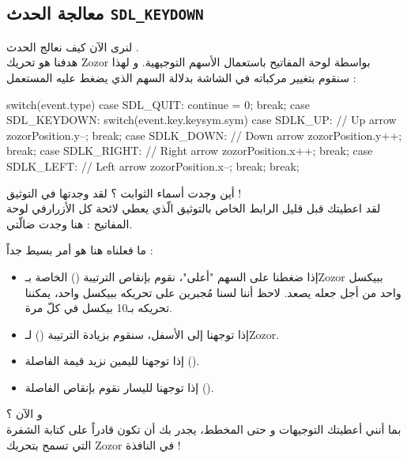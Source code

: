 \subsection{معالجة الحدث \texttt{SDL\_KEYDOWN}}

لنرى الآن كيف نعالج الحدث 
.\\
هدفنا هو تحريك 
\textenglish{Zozor}
بواسطة لوحة المفاتيح باستعمال الأسهم التوجيهية. و لهذا سنقوم بتغيير مركباته في الشاشة بدلالة السهم الذي يضغط عليه المستعمل :

\begin{Csource}
switch(event.type)
{
	case SDL_QUIT:
	continue = 0;
	break;
	case SDL_KEYDOWN:
	switch(event.key.keysym.sym)
	{
		case SDLK_UP: // Up arrow
		zozorPosition.y--;
		break;
		case SDLK_DOWN: // Down arrow
		zozorPosition.y++;
		break;
		case SDLK_RIGHT: // Right arrow
		zozorPosition.x++;
		break;
		case SDLK_LEFT: // Left arrow
		zozorPosition.x--;
		break;
	}
	break;
}
\end{Csource}

أين وجدت أسماء الثوابت ؟  لقد وجدتها في التوثيق !\\
لقد اعطيتك قبل قليل الرابط الخاص بالتوثيق الّذي يعطي لائحة كل الأزرارفي لوحة المفاتيح : هنا وجدت ضالّتي. 

ما فعلناه هنا هو أمر بسيط جداً :

\begin{itemize}
	\item إذا ضغطنا على السهم "أعلى"، نقوم بإنقاص الترتيبة 
	()
	الخاصة بـ\textenglish{Zozor}
	ببيكسل واحد من أجل جعله يصعد. لاحظ أننا لسنا مُجبرين على تحريكه ببيكسل واحد، يمكننا تحريكه بـ10 بيكسل في كلّ مرة.
	\item إذا توجهنا إلى الأسفل، سنقوم بزيادة الترتيبة
	()
	لـ\textenglish{Zozor}.
	\item إذا توجهنا لليمين نزيد قيمة الفاصلة 
	().
	\item إذا توجهنا لليسار نقوم بإنقاص الفاصلة  
	().
\end{itemize}

و الآن ؟\\
بما أنني أعطيتك التوجيهات و حتى المخطط، يجدر بك أن تكون قادراً على كتابة الشفرة التي تسمح بتحريك
\textenglish{Zozor}
في النافذة !


